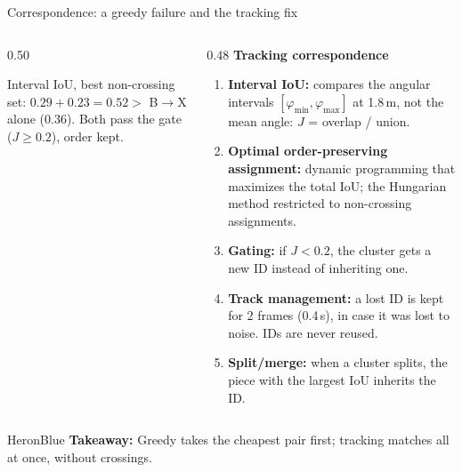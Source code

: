 \documentclass[aspectratio=169,11pt]{beamer}
\newcommand{\takeaway}[1]{%
  \begin{statusbox}{HeronBlue}
    \footnotesize\textbf{Takeaway:} #1
  \end{statusbox}
}
\begin{document}
\begin{frame}{Correspondence: a greedy failure and the tracking fix}
\begin{columns}[T,totalwidth=\textwidth]
\begin{column}{0.50\textwidth}
\par
      {\scriptsize Interval IoU, best non-crossing set: $0.29 + 0.23 = 0.52 >$ B$\to$X alone ($0.36$). Both pass the gate ($J \geq 0.2$), order kept.\par}
    \end{column}
    \begin{column}{0.48\textwidth}
      \footnotesize\textbf{\textcolor{HeronBlue}{Tracking correspondence}}
      \scriptsize
      \begin{enumerate}\setlength{\itemsep}{0pt}
        \item \textbf{Interval IoU:} compares the angular intervals $[\varphi_{\min},\varphi_{\max}]$ at 1.8\,m, not the mean angle: $J$ = overlap / union.
        \item \textbf{Optimal order-preserving assignment:} dynamic programming that maximizes the total IoU; the Hungarian method restricted to non-crossing assignments.
        \item \textbf{Gating:} if $J < 0.2$, the cluster gets a new ID instead of inheriting one.
        \item \textbf{Track management:} a lost ID is kept for 2 frames (0.4\,s), in case it was lost to noise. IDs are never reused.
        \item \textbf{Split/merge:} when a cluster splits, the piece with the largest IoU inherits the ID.
      \end{enumerate}
    \end{column}
  \end{columns}
  \takeaway{Greedy takes the cheapest pair first; tracking matches all at once, without crossings.}
\end{frame}
\end{document}
